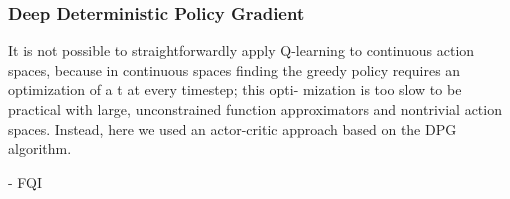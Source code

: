 \subsubsection{Deep Deterministic Policy Gradient}
It is not possible to straightforwardly apply Q-learning to continuous action spaces, because in continuous spaces finding the greedy policy requires an optimization of a t at every timestep; this opti-
mization is too slow to be practical with large, unconstrained function approximators and nontrivial action spaces. Instead, here we used an actor-critic approach based on the DPG algorithm.





















- FQI

